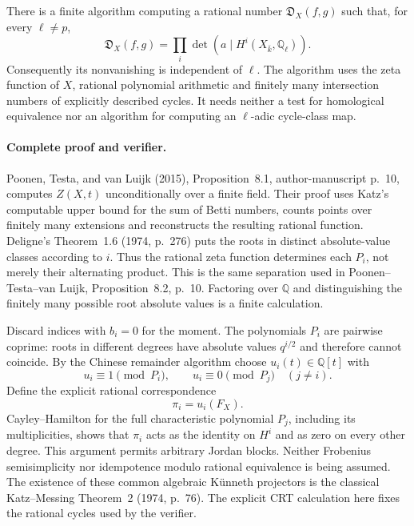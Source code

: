 There is a finite algorithm computing a rational number
\(\mathfrak D_X(f,g)\) such that, for every \(\ell\ne p\),
\[
 \mathfrak D_X(f,g)
       =\prod_i\det\!\left(a\mid
                         H^i(X_{\bar k},\mathbb Q_\ell)\right).
                                                        \tag{CC-XC.13}
\]
Consequently its nonvanishing is independent of \(\ell\).
The algorithm uses the zeta function of \(X\), rational
polynomial arithmetic and finitely many intersection numbers
of explicitly described cycles.  It needs neither a test for
homological equivalence nor an algorithm for computing an
\(\ell\)-adic cycle-class map.

\paragraph{Complete proof and verifier.}
Poonen, Testa, and van Luijk (2015), Proposition~8.1,
author-manuscript p.~10, computes \(Z(X,t)\) unconditionally
over a finite field.  Their proof uses Katz's computable
upper bound for the sum of Betti numbers, counts points over
finitely many extensions and reconstructs the resulting
rational function.  Deligne's Theorem~1.6 (1974, p.~276)
puts the roots in distinct absolute-value classes according
to \(i\).  Thus the rational zeta function determines each
\(P_i\), not merely their alternating product.  This is the
same separation used in Poonen--Testa--van Luijk,
Proposition~8.2, p.~10.  Factoring over \(\mathbb Q\) and
distinguishing the finitely many possible root absolute
values is a finite calculation.

Discard indices with \(b_i=0\) for the moment.
The polynomials \(P_i\) are pairwise coprime: roots in
different degrees have absolute values \(q^{i/2}\) and
therefore cannot coincide.  By the Chinese remainder
algorithm choose \(u_i(t)\in\mathbb Q[t]\) with
\[
 u_i\equiv1\pmod {P_i},\qquad
 u_i\equiv0\pmod {P_j}\quad(j\ne i).
 \]
Define the explicit rational correspondence
\[
                              \pi_i=u_i(F_X).
                                                        \tag{CC-XC.14}
\]
Cayley--Hamilton for the full characteristic polynomial
\(P_j\), including its multiplicities, shows that
\(\pi_i\) acts as the identity on \(H^i\) and as zero
on every other degree.  This argument permits arbitrary
Jordan blocks.  Neither Frobenius semisimplicity nor
idempotence modulo rational equivalence is being assumed.
The existence of these common algebraic Künneth projectors
is the classical Katz--Messing Theorem~2 (1974, p.~76).
The explicit CRT calculation here fixes the rational
cycles used by the verifier.

